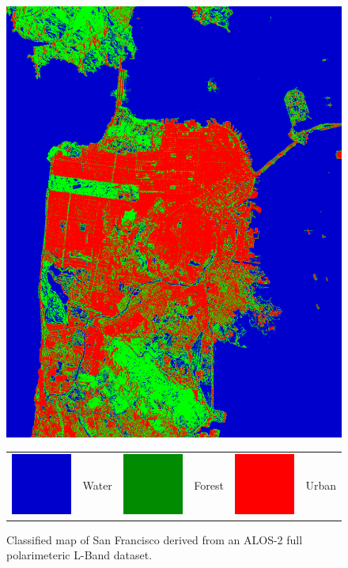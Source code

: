 \begin{figure}[!t]
\centering
\includegraphics[width=0.5\columnwidth]{Figures/ALOS2_SF_3Class/Output_AL2_500k_alt}



		\begin{tabular}{clclcl}
					\includegraphics[width=0.03\columnwidth]{Figures/RS2_SF_3Class/Blue.png} & Water &		\includegraphics[width=0.03\columnwidth]{Figures/RS2_SF_3Class/Green.png} & Forest &  	\includegraphics[width=0.03\columnwidth]{Figures/RS2_SF_3Class/Red.png} &  Urban 
		\end{tabular}
		
		\caption{Classified map of San Francisco derived from an ALOS-2 full polarimeteric L-Band dataset.}
		
\label{fig:compwal2}
\end{figure}











